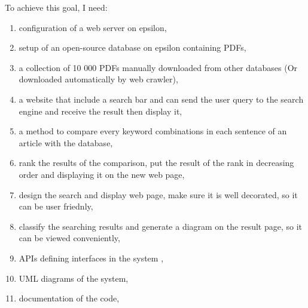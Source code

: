 	To achieve this goal, I need:
\begin{enumerate}
  \item configuration of a web server on epsilon,
  \item setup of an open-source database on epsilon containing PDFs,
  \item a collection of 10 000 PDFs manually downloaded from other databases (Or downloaded automatically by web crawler),
  \item a website that include a search bar and can send the user query to the search engine and receive the result then display it,
  \item a method to compare every keyword combinations in each sentence of an article with the database,
  \item rank the results of the comparison, put the result of the rank in decreasing order and displaying it on the new web page,
  \item design the search and display web page, make sure it is well decorated, so it can be user friednly,
  \item classify the searching results and generate a diagram on the result page, so it can be viewed conveniently,
  \item APIs defining interfaces in the system ,
  \item UML diagrams of the system,
  \item documentation of the code, 
\end{enumerate}
